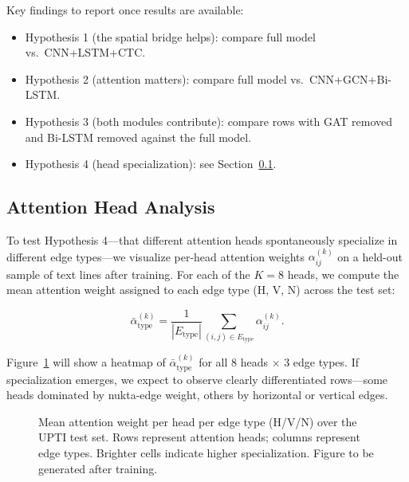 \documentclass[11pt]{article}
\begin{document}
\noindent
Key findings to report once results are available:
\begin{itemize}[nosep]
  \item Hypothesis 1 (the spatial bridge helps): compare full model vs.\
        CNN+LSTM+CTC.
  \item Hypothesis 2 (attention matters): compare full model vs.\ CNN+GCN+Bi-LSTM.
  \item Hypothesis 3 (both modules contribute): compare rows with GAT removed and
        Bi-LSTM removed against the full model.
  \item Hypothesis 4 (head specialization): see Section~\ref{sec:head_analysis}.
\end{itemize}

\subsection{Attention Head Analysis}
\label{sec:head_analysis}

To test Hypothesis 4---that different attention heads spontaneously specialize in
different edge types---we visualize per-head attention weights $\alpha^{(k)}_{ij}$
on a held-out sample of text lines after training.
For each of the $K=8$ heads, we compute the mean attention weight assigned to each
edge type (H, V, N) across the test set:

\begin{equation}
  \bar{\alpha}^{(k)}_{\text{type}} =
    \frac{1}{|E_{\text{type}}|} \sum_{(i,j) \in E_{\text{type}}} \alpha^{(k)}_{ij}.
  \label{eq:head_mean}
\end{equation}

\noindent
Figure~\ref{fig:head_heatmap} will show a heatmap of $\bar{\alpha}^{(k)}_{\text{type}}$
for all 8 heads $\times$ 3 edge types.
If specialization emerges, we expect to observe clearly differentiated rows---some
heads dominated by nukta-edge weight, others by horizontal or vertical edges.

\begin{figure}[t]
\centering
\caption{Mean attention weight per head per edge type (H/V/N) over the UPTI test
         set. Rows represent attention heads; columns represent edge types. Brighter
         cells indicate higher specialization. Figure to be generated after training.}
\label{fig:head_heatmap}
\end{figure}
\end{document}

